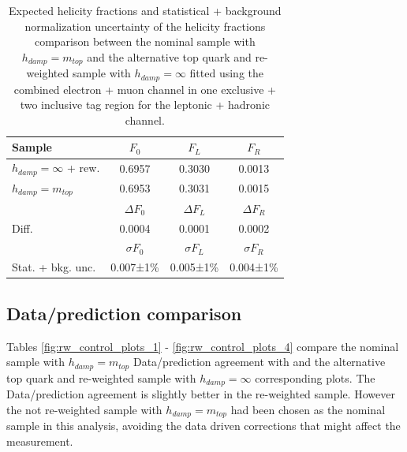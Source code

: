 \begin{table}[!hb]
\centering
\begin{tabular}{l|c|c|c}
\hline \hline
	Sample  & $F_{0}$ & $F_{L}$ & $F_{R}$ \\ \hline\hline
	$h_{damp}=\infty$ + rew. & 0.6957 & 0.3030 & 0.0013 \\
	$h_{damp}=m_{top}$ 		 & 0.6953 & 0.3031 & 0.0015 \\ \hline
			  & $\Delta F_{0}$ & $\Delta F_{L}$ & $\Delta F_{R}$ \\ \hline
	Diff. & 0.0004 & 0.0001 & 0.0002 \\ \hline\hline
		  	  & $\sigma F_{0}$ & $\sigma F_{L}$ & $\sigma F_{R}$ \\ \hline
	Stat. + bkg. unc.	 & 0.007±1\% & 0.005±1\% & 0.004±1\% \\ \hline\hline

\end{tabular}
\caption{Expected helicity fractions and statistical + background normalization uncertainty of the helicity fractions comparison between the nominal \ttbar sample with $h_{damp}=m_{top}$ and the alternative top quark and \ttbar \pt re-weighted sample with $h_{damp}=\infty$ fitted using the combined electron + muon channel in one exclusive + two inclusive \bt tag region for the leptonic + hadronic channel.}
\label{tab:rw_expectedStat_Frac_Comparison}
\end{table}

\subsection{Data/prediction comparison}
Tables \ref{fig:rw_control_plots_1} - \ref{fig:rw_control_plots_4} compare the nominal \ttbar sample with $h_{damp}=m_{top}$ Data/prediction agreement with and the alternative top quark and \ttbar \pt re-weighted sample with $h_{damp}=\infty$ corresponding plots. The Data/prediction agreement is slightly better in the re-weighted sample. However the not re-weighted sample with $h_{damp}=m_{top}$ had been chosen as the nominal \ttbar sample in this analysis, avoiding the data driven corrections that might affect the measurement.

